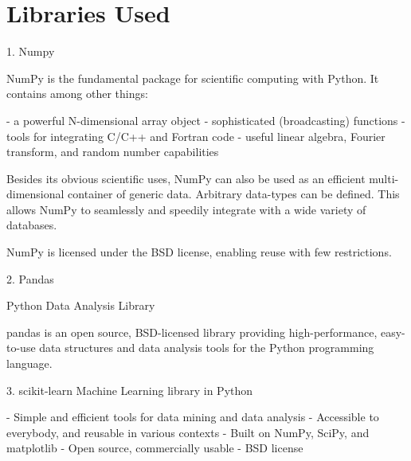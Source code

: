 \documentclass[paper=a4, fontsize=11pt]{scrartcl}
\numberwithin{equation}{section}		%
\numberwithin{figure}{section}			%
\numberwithin{table}{section}				%
\begin{document}
\section{Libraries Used}
1. Numpy

NumPy is the fundamental package for scientific computing with Python. It contains among other things:

  -  a powerful N-dimensional array object
  -  sophisticated (broadcasting) functions
  -  tools for integrating C/C++ and Fortran code
  -  useful linear algebra, Fourier transform, and random number capabilities

Besides its obvious scientific uses, NumPy can also be used as an efficient multi-dimensional container of generic data. Arbitrary data-types can be defined. This allows NumPy to seamlessly and speedily integrate with a wide variety of databases.

NumPy is licensed under the BSD license, enabling reuse with few restrictions.

2. Pandas

Python Data Analysis Library

pandas is an open source, BSD-licensed library providing high-performance, easy-to-use data structures and data analysis tools for the Python programming language.


3. scikit-learn
Machine Learning library in Python

  -  Simple and efficient tools for data mining and data analysis
  -  Accessible to everybody, and reusable in various contexts
  -  Built on NumPy, SciPy, and matplotlib
  -  Open source, commercially usable - BSD license
\end{document}
